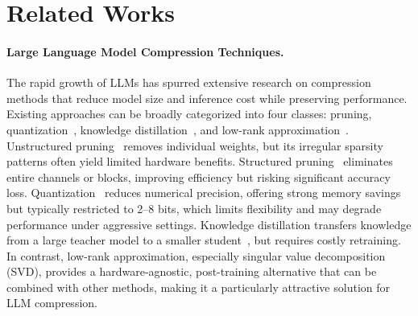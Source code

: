 \section{Related Works}
\paragraph{Large Language Model Compression Techniques.}
The rapid growth of LLMs has spurred extensive research on compression methods that reduce model size and inference cost while preserving performance. Existing approaches can be broadly categorized into four classes: pruning, quantization~\citep{Nagel2021WhitePaperQuantization,frantar2022gptq,hu2025ostquant,lin2023awq,Hu2024I-LLM}, knowledge distillation~\citep{hinton2015distilling}, and low-rank approximation~\citep{yuan2023asvd,Wang2024SVD-LLM}. Unstructured pruning~\citep{ashkboos2024slicegpt,zhang2023pruning} removes individual weights, but its irregular sparsity patterns often yield limited hardware benefits. Structured pruning~\citep{ma2023llmpruner,dettmers2023spqr} eliminates entire channels or blocks, improving efficiency but risking significant accuracy loss. Quantization~\citep{frantar2022gptq,lin2023awq,hu2025ostquant} reduces numerical precision, offering strong memory savings but typically restricted to 2–8 bits, which limits flexibility and may degrade performance under aggressive settings. Knowledge distillation transfers knowledge from a large teacher model to a smaller student~\citep{liu-etal-2024-llm}, but requires costly retraining. In contrast, low-rank approximation, especially singular value decomposition (SVD), provides a hardware-agnostic, post-training alternative that can be combined with other methods, making it a particularly attractive solution for LLM compression.

